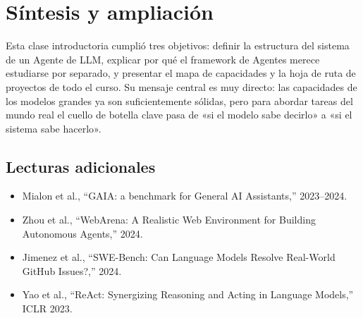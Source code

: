 \section{Síntesis y ampliación}

Esta clase introductoria cumplió tres objetivos: definir la estructura del sistema de un Agente de LLM, explicar por qué el framework de Agentes merece estudiarse por separado, y presentar el mapa de capacidades y la hoja de ruta de proyectos de todo el curso. Su mensaje central es muy directo: las capacidades de los modelos grandes ya son suficientemente sólidas, pero para abordar tareas del mundo real el cuello de botella clave pasa de «si el modelo sabe decirlo» a «si el sistema sabe hacerlo».

\subsection{Lecturas adicionales}

\begin{itemize}
    \item Mialon et al., ``GAIA: a benchmark for General AI Assistants,'' 2023--2024.
    \item Zhou et al., ``WebArena: A Realistic Web Environment for Building Autonomous Agents,'' 2024.
    \item Jimenez et al., ``SWE-Bench: Can Language Models Resolve Real-World GitHub Issues?,'' 2024.
    \item Yao et al., ``ReAct: Synergizing Reasoning and Acting in Language Models,'' ICLR 2023.
\end{itemize}




